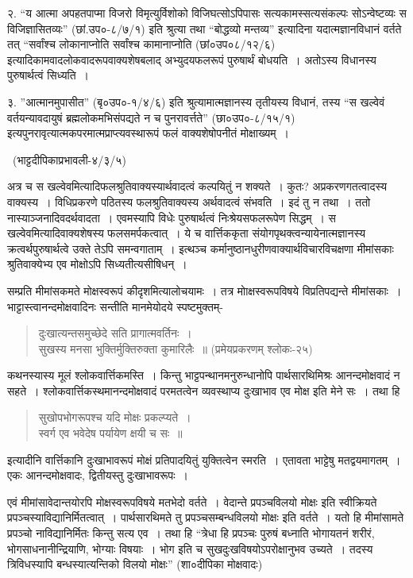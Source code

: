 {२. “य आत्मा अपहतपाप्मा विजरो विमृत्युर्विशोको विजिघत्सोऽपिपासः सत्यकामस्सत्यसंकल्पः सोऽन्वेष्टव्यः स विजिज्ञासितव्यः” (छां.उप०-८/७/१) इति श्रुत्या तथा “बोद्धव्यो मन्तव्य” इत्यादिना यदात्मज्ञानविधानं वर्तते तत् “सर्वांश्च लोकानाप्नोति सर्वांश्च कामानाप्नोति (छां०उप०८/१२/६) इत्यादिकामवादलोकवादरूपवाक्यशेषबलाद् अभ्युदयफलरूपं पुरुषार्थं बोधयति~। अतोऽस्य विधानस्य पुरुषार्थत्वं सिध्यति~। 

३. ”आत्मानमुपासीत” (बृ०उप०-१/४/६) इति श्रुत्यामात्मज्ञानस्य तृतीयस्य विधानं, तस्य “स खल्वेवं वर्तयन्यावदायुषं ब्रह्मलोकमभिसंपद्यते न च पुनरावर्त्तते” (छा०उप०-८/१५/१) इत्यपुनरावृत्यात्मकपरमात्मप्राप्त्यवस्थारूपं फलं वाक्यशेषोपनीतं मोक्षाख्यम्~। 

~\hfill (भाट्टदीपिकाप्रभावली-४/३/५) 

अत्र च स खल्वेवमित्यादिफलश्रुतिवाक्यस्यार्थवादत्वं कल्पयितुं न शक्यते~। कुतः? अप्रकरणगतत्वादस्य वाक्यस्य~। विधिप्रकरणे पठितस्य फलश्रुतिवाक्यस्य अर्थवादत्वं संभवति~। इदं तु न तथा~। ततो नास्याञ्जनादिवदर्थवादता~। एवमस्यापि विधेः पुरुषार्थत्वं निःश्रेयसफलरूपेण सिद्धम्~। स खल्वेवमित्यादिवाक्यशेषस्य फलसमर्पकत्वात्~। ये च वार्त्तिककृता संयोगपृथक्त्वन्यायेनात्मज्ञानस्य क्रत्वर्थपुरुषार्थत्वे उक्ते तेऽपि समन्वगाताम्~। इत्थञ्च कर्मानुष्ठानधुरीणवाक्यार्थविचारविचक्षणा मीमांसकाः श्रुतिवाक्येभ्य एव मोक्षोऽपि सिध्यतीत्यसीषिधन्~। 

सम्प्रति मीमांसकमते मोक्षस्वरूपं कीदृशमित्यालोचयामः~। तत्र मोाक्षस्वरूपविषये विप्रतिपद्यन्ते मीमांसकाः~। भाट्टास्त्वानन्दमोक्षवादिनः सन्तीति मानमेयोदये स्पष्टमुक्तम्-
\begin{verse}
दुःखात्यन्तसमुच्छेदे सति प्रागात्मवर्तिनः~। \\
सुखस्य मनसा भुक्तिर्मुक्तिरुक्ता कुमारिलैः~॥ (प्रमेयप्रकरणम् श्लोकः-२५)
\end{verse}
कथनस्यास्य मूलं श्लोकवार्त्तिकमस्ति~। किन्तु भाट्टपन्थानमनुरुन्धानोपि पार्थसारथिमिश्रः आनन्दमोक्षवादं न सहते~। श्लोकवार्त्तिकस्थमानन्दमोक्षवादं परमतत्वेन व्यवस्थाप्य दुःखाभाव एव मोक्ष इति मेने सः~। तथा हि
\begin{verse}
सुखोपभोगरूपश्च यदि मोक्षः प्रकल्प्यते~। \\
स्वर्ग एव भवेदेष पर्यायेण क्षयी च सः~॥ 
\end{verse}
इत्यादीनि वार्त्तिकानि दुःखाभावरूपं मोक्षं प्रतिपादयितुं युक्तित्वेन स्मरति~। एतावता भाट्टेषु मतद्वयमागतम्~। एकः आनन्दमोक्षवादः, द्वितीयस्तु दुःखाभावरूपः~। 

एवं मीमांसावेदान्तयोरपि मोक्षस्वरूपविषये मतभेदो वर्तते~। वेदान्ते प्रपञ्चविलयो मोक्षः इति स्वीक्रियते प्रपञ्चस्याविद्यानिर्मितत्वात्~। पार्थसारथिमते तु प्रपञ्चसम्बन्धविलयो मोक्षः इति वर्तते~। यतो हि मीमांसामते प्रपञ्चो नाविद्यानिर्मितः किन्तु सत्य एव~। तथा हि  “त्रेधा हि प्रपञ्चः पुरुषं बध्नाति भोगायतनं  शरीरं, भोगसाधनानीन्द्रियाणि, भोग्याः विषयाः~। भोग इति च सुखदुःखविषयोऽपरोक्षानुभव उच्यते~। तदस्य त्रिविधस्यापि बन्धस्यात्यन्तिको विलयो मोक्षः” (शा०दीपिका मोक्षवादः)

}
